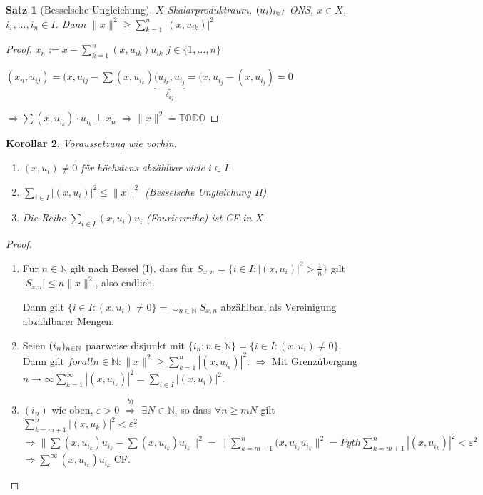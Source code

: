 \documentclass[ngerman]{report}
\theoremstyle{plain}%
\newtheorem{thm}{Satz}[chapter]
\newtheorem{cor}[thm]{Korollar}
\theoremstyle{definition}%
\theoremstyle{myStyle}
\newcommand{\N}{\mathbb{N}}
\newcommand{\norm}[1]{\|#1\|}
\newcommand{\df}[1][]{%
	\overset{#1}{\Rightarrow}
}
\newcommand{\TODO}{\text{$\mathbb{TODO}$}}
\begin{document}
	\begin{thm}[Besselsche Ungleichung]
		$X$ Skalarproduktraum, $(u_i)_{i\in I}$ ONS, $x\in X$, $i_1,\dots,i_n \in I$. Dann $\norm{x}^2 \geq \sum_{k=1}^n |(x,u_{ik})|^2$
	\end{thm}

	\begin{proof}
		$x_n := x - \sum_{k=1}^n (x,u_{ik}) u_{ik}$ $j\in \{1,\dots,n\}$\par
		$(x_n, u_{ij}) = (x,u_{ij} - \sum (x,u_{i_k}) \underbrace{(u_{i_k},u_{i_j}}_{\delta_{kj}}
		= (x, u_{i_j} - (x, u_{i_j}) = 0$\par
		$\df \sum (x, u_{i_k}) \cdot u_{i_k} \perp x_n$
	$\df \norm{x}^2 = \TODO$
	\end{proof}

	\begin{cor}
		Voraussetzung wie vorhin.\par
		\begin{enumerate}
			\item $(x, u_i) \neq 0$ für höchstens abzählbar viele $i\in I$.
			\item $\sum_{i\in I} |(x, u_i)|^2 \leq \norm{x}^2$ (Besselsche Ungleichung II)
			\item Die Reihe $\sum_{i\in I} (x,u_i)u_i$ (Fourierreihe) ist CF in $X$.
		\end{enumerate}
	\end{cor}

	\begin{proof}
		\begin{enumerate}
			\item Für $n\in\N$ gilt nach Bessel (I), dass für $S_{x,n} = \{ i\in I: |(x, u_i)| ^2 > \frac{1}{n} \}$ 
			gilt $|S_{x.n}| \leq n \norm{x}^2$, also endlich. \par
			Dann gilt $\{i \in I: (x,u_i) \neq 0\} = \cup_{n\in\N} S_{x,n}$ abzählbar, als Vereinigung abzählbarer Mengen.
			\item Seien $\ff{i}{n}{\N}$ paarweise disjunkt mit $\{i_n : n\in \N\} = \{i\in I: (x,u_i) \neq 0\}$.
			Dann gilt $forall n\in \N: \norm{x}^2 \geq \sum_{k=1}^n |(x,u_{i_k})|^2.$
			$\df$ Mit Grenzübergang $n\to \infty \sum_{k=1}^\infty |(x,u_{i_k})|^2 = \sum_{i\in I} |(x,u_i)|^2.$
			\item $(i_n)$ wie oben, $\varepsilon > 0$ 
			$\df[b)]$ $\exists N\in\N$, so dass $\forall n\geq m N$ gilt 
			$\sum_{k = m+1}^n |(x,u_k)|^2 < \varepsilon^2$
			$\df \norm{\sum (x,u_{i_k})u_{i_k} - \sum (x,u_{i_k}) u_{i_k}}^2
			= \norm{ \sum_{k= m+1} ^ n (x, u_{i_k} u_{i_k}}^2 = Pyth \sum_{k=m+1}^n |(x,u_{i_k})|^2 < \varepsilon^2$
			$\df \sum^\infty (x,u_{i_k})u_{i_k} $ CF.
		\end{enumerate}
	\end{proof}
\end{document}
